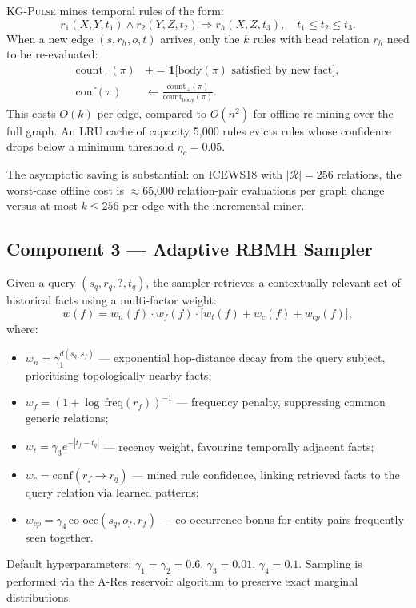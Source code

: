 \documentclass[10pt,a4paper,twocolumn]{article}
\theoremstyle{definition}
\newcommand{\ourmodel}{\textsc{KG-Pulse}}
\newcommand{\calR}{\mathcal{R}}
\begin{document}
\ourmodel{} mines temporal rules of the form:
\[
  r_1(X,Y,t_1) \wedge r_2(Y,Z,t_2) \Rightarrow r_h(X,Z,t_3),
  \quad t_1 \le t_2 \le t_3.
\]
When a new edge $(s, r_h, o, t)$ arrives, only the $k$ rules with head
relation $r_h$ need to be re-evaluated:
\begin{align}
  \text{count}_+(\pi) &\mathrel{+}=
    \mathbf{1}\bigl[\text{body}(\pi)\text{ satisfied by new fact}\bigr], \\
  \text{conf}(\pi) &\leftarrow
    \frac{\text{count}_+(\pi)}{\text{count}_{\mathrm{body}}(\pi)}.
  \label{eq:conf_update}
\end{align}
This costs $O(k)$ per edge, compared to $O(n^2)$ for offline re-mining
over the full graph.
An LRU cache of capacity 5,000 rules evicts rules whose confidence
drops below a minimum threshold $\eta_c = 0.05$.

The asymptotic saving is substantial: on ICEWS18 with $|\calR| = 256$
relations, the worst-case offline cost is $\approx$65,000 relation-pair
evaluations per graph change versus at most $k \le 256$ per edge
with the incremental miner.

\subsection{Component 3 — Adaptive RBMH Sampler}
\label{sec:sampler}

Given a query $(s_q, r_q, ?, t_q)$, the sampler retrieves a
contextually relevant set of historical facts using a multi-factor weight:
\begin{equation}
  w(f) = w_n(f)\cdot w_f(f)\cdot\bigl[w_t(f) + w_c(f) + w_{cp}(f)\bigr],
  \label{eq:rbmh}
\end{equation}
where:
\begin{itemize}[leftmargin=1.4em,itemsep=2pt,topsep=2pt]
  \item $w_n = \gamma_1^{d(s_q, s_f)}$ — exponential hop-distance decay
        from the query subject, prioritising topologically nearby facts;
  \item $w_f = (1 + \log\,\text{freq}(r_f))^{-1}$ — frequency penalty,
        suppressing common generic relations;
  \item $w_t = \gamma_3 e^{-|t_f - t_q|}$ — recency weight, favouring
        temporally adjacent facts;
  \item $w_c = \text{conf}(r_f \!\to\! r_q)$ — mined rule confidence,
        linking retrieved facts to the query relation via learned patterns;
  \item $w_{cp} = \gamma_4\,\text{co\_occ}(s_q, o_f, r_f)$ —
        co-occurrence bonus for entity pairs frequently seen together.
\end{itemize}
Default hyperparameters: $\gamma_1 = \gamma_2 = 0.6$,
$\gamma_3 = 0.01$, $\gamma_4 = 0.1$.
Sampling is performed via the A-Res reservoir algorithm
\cite{Vitter1985reservoir} to preserve exact marginal distributions.
\end{document}
